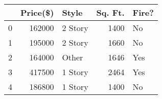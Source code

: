 \begin{tabular}{lrlrl}
\toprule
{} &  Price(\$) &    Style &  Sq. Ft. & Fire? \\
\midrule
0 &    162000 &  2 Story &     1400 &    No \\
1 &    195000 &  2 Story &     1660 &    No \\
2 &    164000 &    Other &     1646 &   Yes \\
3 &    417500 &  1 Story &     2464 &   Yes \\
4 &    186800 &  1 Story &     1400 &    No \\
\bottomrule
\end{tabular}
